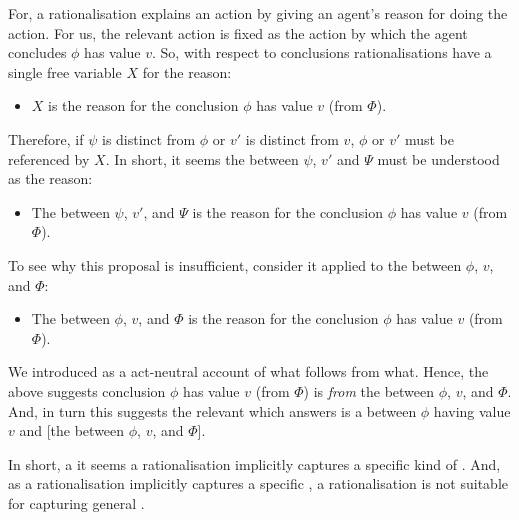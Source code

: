 \begin{note}
  For, a rationalisation explains an action by giving an agent's reason for doing the action.
  For us, the relevant action is fixed as the action by which the agent concludes \(\phi\) has value \(v\).
  So, with respect to conclusions rationalisations have a single free variable \(X\) for the \agents{} reason:
  \begin{itemize}
  \item
    \(X\) is the \agents{} reason for the conclusion \(\phi\) has value \(v\) (from \(\Phi\)).
  \end{itemize}
  Therefore, if \(\psi\) is distinct from \(\phi\) or \(v'\) is distinct from \(v\), \(\phi\) or \(v'\) must be referenced by \(X\).
  In short, it seems the \ros{} between \(\psi\), \(v'\) and \(\Psi\) must be understood as the \agents{} reason:
  \begin{itemize}
  \item
    The \ros{} between \(\psi\), \(v'\), and \(\Psi\) is the \agents{} reason for the conclusion \(\phi\) has value \(v\) (from \(\Phi\)).
  \end{itemize}
  To see why this proposal is insufficient, consider it applied to the \ros{} between \(\phi\), \(v\), and \(\Phi\):
  \begin{itemize}
  \item
    The \ros{} between \(\phi\), \(v\), and \(\Phi\) is the \agents{} reason for the conclusion \(\phi\) has value \(v\) (from \(\Phi\)).
  \end{itemize}
  We introduced \ros{} as a act-neutral account of what follows from what.
  Hence, the above suggests conclusion \(\phi\) has value \(v\) (from \(\Phi\)) is \emph{from} the \ros{} between \(\phi\), \(v\), and \(\Phi\).
  And, in turn this suggests the relevant \ros{} which answers \qWhy{} is a \ros{} between \(\phi\) having value \(v\) and [the \ros{} between \(\phi\), \(v\), and \(\Phi\)].

  In short, a it seems a rationalisation implicitly captures a specific kind of \ros{}.
  And, as a rationalisation implicitly captures a specific , a rationalisation is not suitable for capturing general .
\end{note}

